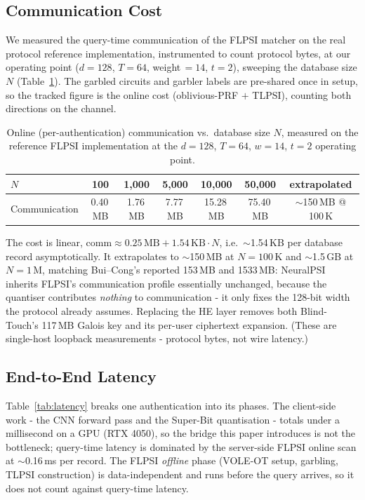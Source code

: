 \documentclass[11pt,a4paper]{article}
\begin{document}
\subsection{Communication Cost}


We measured the query-time communication of the FLPSI matcher on the real protocol
reference implementation, instrumented to count protocol bytes, at our operating point
($d=128$, $T=64$, weight$\,=14$, $t=2$), sweeping the database size $N$
(Table~\ref{tab:comm}). The garbled circuits and garbler labels are pre-shared once in
setup, so the tracked figure is the online cost (oblivious-PRF $+$ TLPSI), counting both
directions on the channel.

\begin{table}[h]
\centering
\caption{Online (per-authentication) communication vs.\ database size $N$, measured on
the reference FLPSI implementation at the $d{=}128$, $T{=}64$, $w{=}14$, $t{=}2$ operating point.}
\label{tab:comm}
\begin{tabular}{lcccccc}
\hline
$N$ & 100 & 1{,}000 & 5{,}000 & 10{,}000 & 50{,}000 & extrapolated \\
\hline
Communication & 0.40\,MB & 1.76\,MB & 7.77\,MB & 15.28\,MB & 75.40\,MB &
$\sim$150\,MB @ 100\,K \\
\hline
\end{tabular}
\end{table}

The cost is linear, $\text{comm}\approx 0.25\,\text{MB}+1.54\,\text{KB}\cdot N$, i.e.\
$\sim$1.54\,KB per database record asymptotically. It extrapolates to $\sim$150\,MB at
$N=100\,$K and $\sim$1.5\,GB at $N=1\,$M, matching Bui--Cong's reported 153\,MB and
1533\,MB: NeuralPSI inherits FLPSI's communication profile essentially unchanged, because
the quantiser contributes \emph{nothing} to communication - it only fixes the 128-bit
width the protocol already assumes. Replacing the HE layer removes both Blind-Touch's
117\,MB Galois key and its per-user ciphertext expansion. (These are single-host loopback
measurements - protocol bytes, not wire latency.)

\subsection{End-to-End Latency}


Table~\ref{tab:latency} breaks one authentication into its phases. The client-side work
- the CNN forward pass and the Super-Bit quantisation - totals under a millisecond on
a GPU (RTX 4050), so the bridge this paper introduces is not the bottleneck; query-time
latency is dominated by the server-side FLPSI online scan at $\sim$0.16\,ms per record.
The FLPSI \emph{offline} phase (VOLE-OT setup, garbling, TLPSI construction) is
data-independent and runs before the query arrives, so it does not count against
query-time latency.
\end{document}
